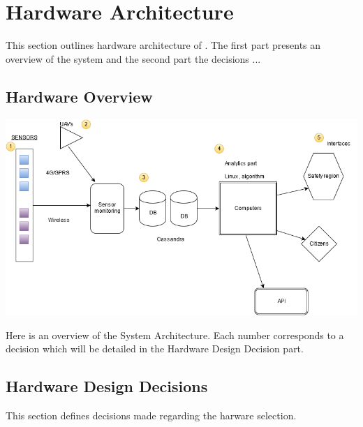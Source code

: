 \chapter{Hardware Architecture}
\label{ch:hardware}
This section outlines hardware architecture of . The first part presents an overview of the system and the second part the decisions ...

\section{Hardware Overview}

\includegraphics[scale=0.5]{images/HardwareArchitectureOverview.png}

Here is an overview of the System Architecture. Each number corresponds to a decision which will be detailed in the Hardware Design Decision part.


\section{Hardware Design Decisions}
This section defines decisions made regarding the harware selection.

